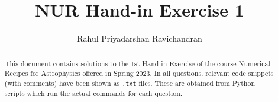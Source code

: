 \documentclass[a4paper,10pt]{article}
\title{NUR Hand-in Exercise 1}
\author{Rahul Priyadarshan Ravichandran}
\begin{document}
\maketitle

\begin{abstract}
	\centering
	This document contains solutions to the 1st Hand-in Exercise of the course Numerical Recipes for Astrophysics offered in Spring 2023. In all questions, relevant code snippets (with comments) have been shown as \texttt{.txt} files. These are obtained from Python scripts which run the actual commands for each question.  
\end{abstract}




\end{document}
